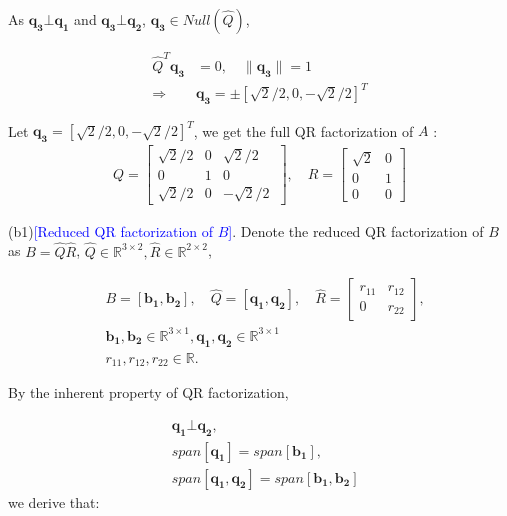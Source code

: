 As $\mathbf{q_3} \bot \mathbf{q_1}$ and 
$\mathbf{q_3} \bot \mathbf{q_2} $, 
$\mathbf{q_3} \in Null(\hat{Q})$,


\begin{align*}
    \hat{Q}^T\mathbf{q_3} &= 0, \quad \|\mathbf{q_3}\| = 1 \nonumber \\
    \Rightarrow&
    \mathbf{q_3} = \pm [\sqrt{2}/2, 0, -\sqrt{2}/2]^T
\end{align*}

Let $\mathbf{q_3} = [\sqrt{2}/2, 0, -\sqrt{2}/2]^T$, we get
the full QR factorization of $A$
:
\begin{align*}
    Q = \begin{bmatrix}
        \sqrt{2}/2 & 0 & \sqrt{2}/2 \\ 0 & 1 & 0\\ \sqrt{2}/2 & 0 & -\sqrt{2}/2\
    \end{bmatrix},\quad
    R = \begin{bmatrix}
        \sqrt{2} & 0\\ 0 & 1 \\ 0 & 0
        \end{bmatrix}
    \end{align*}



(b1)\textcolor{blue}{[Reduced QR factorization of $B$]}. 
Denote the reduced QR factorization of $B$ as
$B = \hat{Q}\hat{R}$, $
    \hat{Q} \in \mathbb{R}^{3 \times 2},
    \hat{R} \in \mathbb{R}^{2 \times 2} 
    $,

\begin{align*}
    &B = [\mathbf{b_1}, \mathbf{b_2}],
    \quad 
    \hat{Q} = [\mathbf{q_1}, \mathbf{q_2}], \quad
    \hat{R} = \begin{bmatrix}
                r_{11} & r_{12}\\ 0 & r_{22}
            \end{bmatrix},\\
    &\mathbf{b_1, b_2}  \in \mathbb{R}^{3\times 1}, 
    \mathbf{q_1, q_2} \in \mathbb{R}^{3\times 1}\\
    &r_{11}, r_{12}, r_{22} \in \mathbb{R}.
\end{align*}

By the inherent property of QR factorization, 

\begin{align*}
    &\mathbf{q_1} \bot \mathbf{q_2},\\
    &span[\mathbf{q_1}] = span[\mathbf{b_1}],\\
    &span[\mathbf{q_1, q_2}] = span[\mathbf{b_1, b_2}]    
\end{align*}
we derive that:

